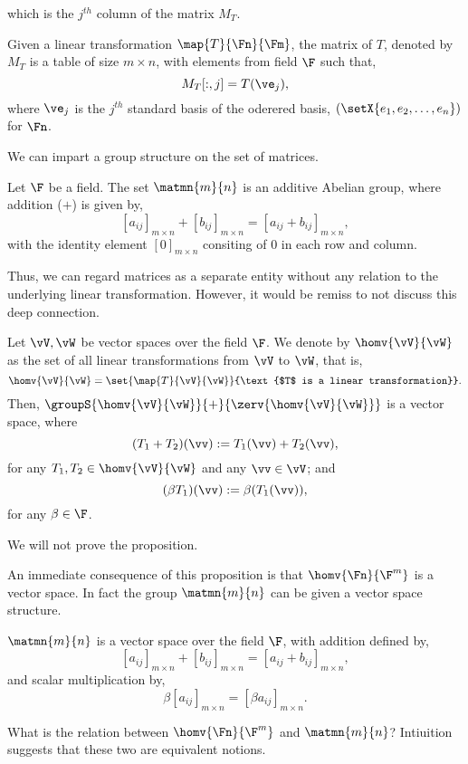 which is the $j^{th}$ column of the matrix $M_{T}$. 
\begin{Definition}
    Given a linear transformation $\map{T}{\Fn}{\Fm}$, the matrix of $T$, denoted by $M_{T}$ is a table of
    size $m\times n$, with elements from field $\F$ such that,
    \[M_{T}[:,j] = T(\ve_{j}),\]
    where $\ve_{j}$ is the $j^{th}$ standard basis of the oderered basis,
    $\left(\setX{e_1,e_2,\ldots,e_n}\right)$ for $\Fn$.
\end{Definition}
We can impart a group structure on the set of matrices.
\begin{Proposition}
    Let $\F$ be a field. The set $\matmn{m}{n}$ is an additive Abelian group, where addition ($+$) is given
    by,
    \[{[a_{ij}]}_{m\times n} + {[b_{ij}]}_{m\times n} = {[a_{ij} + b_{ij}]}_{m\times n}, \]
    with the identity element ${[0]}_{m\times n}$ consiting of $0$ in each row and column.
\end{Proposition}
Thus, we can regard matrices as a separate entity without any relation to the underlying linear
transformation. However, it would be remiss to not discuss this deep connection.
\begin{Proposition}
    Let $\vV,\vW$ be vector spaces over the field $\F$. We denote by $\homv{\vV}{\vW}$ as
    the set of all linear transformations from $\vV$ to $\vW$, that is,
    \[\homv{\vV}{\vW} = \set{\map{T}{\vV}{\vW}}{\text{$T$ is a linear transformation}}.\]
    Then, $\groupS{\homv{\vV}{\vW}}{+}{\zerv{\homv{\vV}{\vW}}}$ is a vector space, where 
    \[(T_1 + T_2)(\vv) := T_1(\vv) + T_2(\vv),\]
    for any $T_1,T_2 \in \homv{\vV}{\vW}$ and any $\vv \in \vV$; and
    \[(\beta T_1)(\vv) := \beta(T_1(\vv)), \]
    for any $\beta \in \F$.
\end{Proposition}
We will not prove the proposition.

An immediate consequence of this proposition is that $\homv{\Fn}{\F^{m}}$ is a vector space.
In fact the group $\matmn{m}{n}$ can be given a vector space structure.

\begin{Proposition}
    $\matmn{m}{n}$ is a vector space over the field $\F$, with addition defined by,
    \[{[a_{ij}]}_{m\times n} + {[b_{ij}]}_{m\times n} = {[a_{ij} + b_{ij}]}_{m\times n}, \]
    and scalar multiplication by,
    \[\beta{[a_{ij}]}_{m\times n} = {[\beta a_{ij}]}_{m\times n}.\]
\end{Proposition}

What is the relation between $\homv{\Fn}{\F^{m}}$ and $\matmn{m}{n}$? Intiuition suggests that these two are
equivalent notions. 

